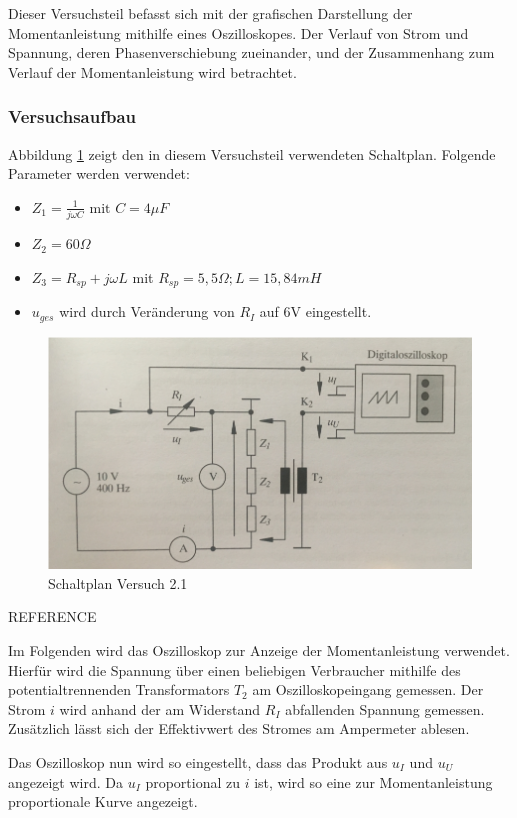 Dieser Versuchsteil befasst sich mit der grafischen Darstellung der Momentanleistung mithilfe eines Oszilloskopes. Der Verlauf von Strom und Spannung, deren Phasenverschiebung zueinander, und der Zusammenhang zum Verlauf der Momentanleistung wird betrachtet.


\subsubsection{Versuchsaufbau}

Abbildung \ref{fig:Plan2-1} zeigt den in diesem Versuchsteil verwendeten Schaltplan. Folgende Parameter werden verwendet:
\begin{itemize}
\item $Z_1 = \frac{1}{j\omega C} \mbox{ mit } C=4\mu F$
\item $Z_2 = 60\Omega$
\item $Z_3 = R_{sp} + j\omega L$ mit $R_{sp} = 5,5\Omega; L=15,84mH$
\item $u_{ges}$ wird durch Veränderung von $R_I$ auf 6V eingestellt.
\end{itemize}

\begin{figure}[h]
\centering
\includegraphics[width=0.7\linewidth]{Images/Aufbau2-1.png}
\caption{Schaltplan Versuch 2.1}
\label{fig:Plan2-1}
\end{figure}
\large{REFERENCE}

Im Folgenden wird das Oszilloskop zur Anzeige der Momentanleistung verwendet. Hierfür wird die Spannung über einen beliebigen Verbraucher mithilfe des potentialtrennenden Transformators $T_2$ am Oszilloskopeingang gemessen. Der Strom $i$ wird anhand der am Widerstand $R_I$ abfallenden Spannung gemessen. Zusätzlich lässt sich der Effektivwert des Stromes am Ampermeter ablesen.

Das Oszilloskop nun wird so eingestellt, dass das Produkt aus $u_I$ und $u_U$ angezeigt wird. Da $u_I$ proportional zu $i$ ist, wird so eine zur Momentanleistung proportionale Kurve angezeigt.

